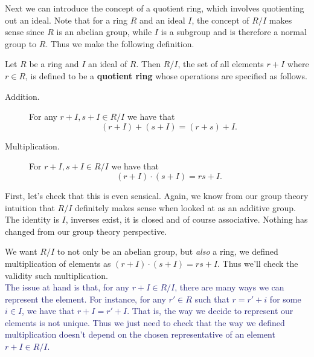 \documentclass[12pt,letterpaper]{algebra_book}
\theoremstyle{definition}
\begin{document}
    Next we can introduce the concept of a quotient ring, which
    involves quotienting out an ideal. Note that for a ring $R$
    and an ideal $I$, the concept of $R/I$ makes sense since $R$
    is an abelian group, while $I$ is a subgroup and is therefore a
    normal group to $R$. Thus we make the following definition.

    \begin{definition}
        Let $R$ be a ring and $I$ an ideal of $R$. Then $R/I$, the
        set of all elements $r + I$ where $r \in R$, is
        defined to be a \textbf{quotient ring} whose operations
        are specified as follows. 
        \begin{description}
            \item[Addition.] For any $r + I, s + I \in R/I$ we have
            that 
            \[
                (r + I) + (s + I) = (r + s) + I.
            \]
            \item[Multiplication.]
            For $r + I, s + I \in R/I$ we have that 
            \[
                (r + I)\cdot(s + I) = rs + I.
            \]
        \end{description}
    \end{definition}
    First, let's check that this is even sensical. Again, we know from
    our group theory intuition that $R/I$ definitely makes sense
    when looked at as an additive group. The identity is $I$,
    inverses exist, it is closed and of course associative. Nothing has changed from our
    group theory perspective. 

    We want $R/I$ to not only be an abelian group, but
    \textit{also} a ring, we defined multiplication of elements as
    $(r + I)\cdot(s + I) = rs + I$. Thus we'll check the validity
    such multiplication. 
    \\

    \textcolor{MidnightBlue}{The issue at hand is that, for any $r +
    I \in R/I$, there are many ways we can represent the element.
    For instance, for any $r' \in R$ such that $r = r' + i$ for
    some $i \in I$, we have that $r + I = r' + I$. That is, the way we
    decide to represent our elements is not unique. Thus we just
    need to check that the way we defined multiplication doesn't
    depend on the chosen representative of an element $r + I \in
    R/I$.}
    
\end{document}
